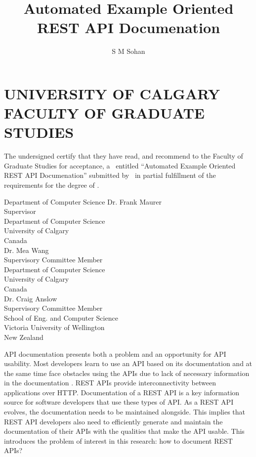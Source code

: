 \documentclass[12pt]{ucalgthes1}
\title{Automated Example Oriented REST API Documenation}
\author{S M Sohan}
\newcommand{\thesistitle}{Automated Example Oriented REST API Documenation}
\begin{document}
\makethesistitle
{}     %
\setcounter{page}{2}
\chapter*{UNIVERSITY OF CALGARY \\ FACULTY OF GRADUATE STUDIES}
\thispagestyle{empty}
The undersigned certify that they have read, and recommend
to the Faculty of Graduate Studies for acceptance, a \Thesis\ entitled
``\thesistitle'' submitted by \Author\
in partial fulfillment of the requirements for the degree of
\Degree.\\

%
%
\begin{signing}{Department of Computer Science}
\signline
Dr. Frank Maurer \\
Supervisor\\
Department of Computer Science \\
University of Calgary \\
Canada\\
\signline
Dr. Mea Wang\\
Supervisory Committee Member\\
Department of Computer Science \\
University of Calgary \\
Canada\\
\signline
Dr. Craig Anslow\\
Supervisory Committee Member\\
School of Eng. and Computer Science \\
Victoria University of Wellington\\
New Zealand\\
\end{signing}
%
\newpage
{}
{}
API documentation presents both a problem and an opportunity for API usability. Most developers learn to use an API based on its documentation and at the same time face obstacles using the APIs due to lack of necessary information in the documentation \cite{Robillard_what_makes}. REST APIs provide interconnectivity between applications over HTTP. Documentation of a REST API is a key information source for software developers that use these types of API. As a REST API evolves, the documentation needs to be maintained alongside. This implies that REST API developers also need to efficiently generate and maintain the documentation of their APIs with the qualities that make the API usable. This introduces the problem of interest in this research: how to document REST APIs?
\end{document}
